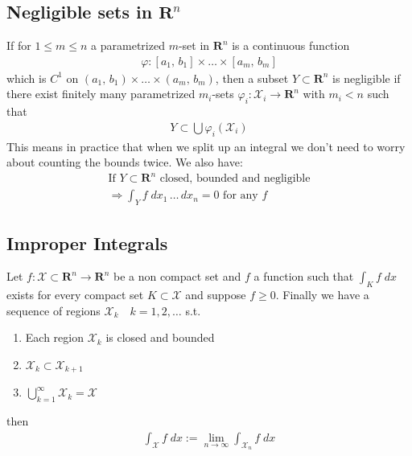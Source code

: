 \documentclass[8pt]{extarticle}
\newcommand{\R}{{\mathbb R}}
\newcommand{\X}{{\mathcal X}}
\newcommand{\ra}{{\rightarrow}}
\newcommand{\Ra}{{\Rightarrow}}
\def\R{\mathbf{R}}
\begin{document}
\begin{multicols*}{3}
  \subsection{Negligible sets in $\R^n$}
  If for $1 \leq m \leq n$ a parametrized $m$-set
  in $\R^n$ is a continuous function
  \begin{align*}
    \varphi: [a_1,\, b_1] \times \dots \times [a_m,\, b_m]
  \end{align*}
  which is $C^1$ on $(a_1,\, b_1) \times \dots \times (a_m,\, b_m)$,
  then a subset $Y \subset \R^n$ is negligible if there exist finitely
  many parametrized $m_i$-sets $\varphi_i: \X_i \ra \R^n$ with $m_i < n$ such that
  \begin{align*}
    Y \subset \bigcup \varphi_i (\X_i)
  \end{align*}
  This means in practice that when we split up an
  integral we don't need to worry about counting the bounds twice.
  We also have:
  \begin{align*}
    \text{If } Y \subset \R^n \text{ closed, bounded and negligible} \\
    \Ra \int_Y f \; dx_1 \, \dots \, dx_n = 0 \text{ for any } f
  \end{align*}
  \subsection{Improper Integrals}
  Let $f: \X\subset \R^n \ra \R^n$ be a non compact set and
  $f$ a function such that $\int_K f \; dx$ exists for every
  compact set $K \subset \X$ and suppose $f \geq 0$. Finally
  we have a sequence of regions $\X_k \quad k = 1, 2 , \dots$ s.t.
  \begin{enumerate}[label=(\arabic*)]
    \item Each region $\X_k$ is closed and bounded
    \item $\X_k \subset \X_{k+1}$
    \item $\bigcup_{k = 1}^\infty \X_k = \X$
  \end{enumerate}
  then
  \begin{align*}
    \int_\X f \; dx := \lim_{n \ra \infty} \int_{\X_n} f \; dx
  \end{align*}

\end{multicols*}
\end{document}

